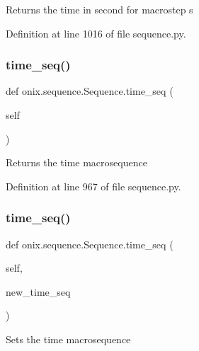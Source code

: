 \begin{DoxyVerb}Returns the time in second for macrostep s
\end{DoxyVerb}
 

Definition at line 1016 of file sequence.\+py.

\mbox{\label{classonix_1_1sequence_1_1Sequence_ab7a35d62cc3f5afd8a71a429d46c2732}} 
\subsubsection{\texorpdfstring{time\+\_\+seq()}{time\_seq()}\hspace{0.1cm}{\footnotesize\ttfamily [1/2]}}
{\footnotesize\ttfamily def onix.\+sequence.\+Sequence.\+time\+\_\+seq (\begin{DoxyParamCaption}\item[{}]{self }\end{DoxyParamCaption})}

\begin{DoxyVerb}Returns the time macrosequence
\end{DoxyVerb}
 

Definition at line 967 of file sequence.\+py.

\mbox{\label{classonix_1_1sequence_1_1Sequence_a7e33e7f75467dc9361a0f57003000faa}} 
\subsubsection{\texorpdfstring{time\+\_\+seq()}{time\_seq()}\hspace{0.1cm}{\footnotesize\ttfamily [2/2]}}
{\footnotesize\ttfamily def onix.\+sequence.\+Sequence.\+time\+\_\+seq (\begin{DoxyParamCaption}\item[{}]{self,  }\item[{}]{new\+\_\+time\+\_\+seq }\end{DoxyParamCaption})}

\begin{DoxyVerb}Sets the time macrosequence
\end{DoxyVerb}
 

